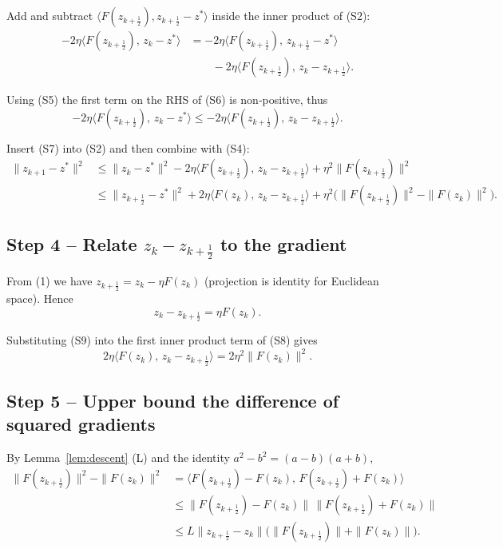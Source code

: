 \documentclass{article}
\begin{document}
Add and subtract $\langle F(z_{k+\frac12}),z_{k+\frac12}-z^{*}\rangle$ inside the inner product of (S2):
\[
\begin{aligned}
-2\eta\langle F(z_{k+\frac12}),\,z_{k}-z^{*}\rangle
&=-2\eta\langle F(z_{k+\frac12}),\,z_{k+\frac12}-z^{*}\rangle\\
&\qquad-2\eta\langle F(z_{k+\frac12}),\,z_{k}-z_{k+\frac12}\rangle .
\end{aligned}
\tag{S6}
\]

Using (S5) the first term on the RHS of (S6) is non‑positive, thus
\[
-2\eta\langle F(z_{k+\frac12}),\,z_{k}-z^{*}\rangle
\le -2\eta\langle F(z_{k+\frac12}),\,z_{k}-z_{k+\frac12}\rangle .
\tag{S7}
\]

Insert (S7) into (S2) and then combine with (S4):
\[
\begin{aligned}
\|z_{k+1}-z^{*}\|^{2}
&\le \|z_{k}-z^{*}\|^{2}
-2\eta\langle F(z_{k+\frac12}),\,z_{k}-z_{k+\frac12}\rangle
+\eta^{2}\|F(z_{k+\frac12})\|^{2} \\
&\le \|z_{k+\frac12}-z^{*}\|^{2}
+2\eta\langle F(z_{k}),\,z_{k}-z_{k+\frac12}\rangle
+\eta^{2}\bigl(\|F(z_{k+\frac12})\|^{2}-\|F(z_{k})\|^{2}\bigr).
\end{aligned}
\tag{S8}
\]

\subsection*{Step 4 – Relate $z_{k}-z_{k+\frac12}$ to the gradient}
From (1) we have $z_{k+\frac12}=z_{k}-\eta F(z_{k})$ (projection is identity for Euclidean space). Hence
\[
z_{k}-z_{k+\frac12}= \eta F(z_{k}).
\tag{S9}
\]

Substituting (S9) into the first inner product term of (S8) gives
\[
2\eta\langle F(z_{k}),\,z_{k}-z_{k+\frac12}\rangle
=2\eta^{2}\|F(z_{k})\|^{2}.
\tag{S10}
\]

\subsection*{Step 5 – Upper bound the difference of squared gradients}
By Lemma~\ref{lem:descent} (L) and the identity $a^{2}-b^{2}=(a-b)(a+b)$,
\[
\begin{aligned}
\|F(z_{k+\frac12})\|^{2}-\|F(z_{k})\|^{2}
&=\langle F(z_{k+\frac12})-F(z_{k}),\,F(z_{k+\frac12})+F(z_{k})\rangle\\
&\le \|F(z_{k+\frac12})-F(z_{k})\|\,\|F(z_{k+\frac12})+F(z_{k})\|\\
&\le L\|z_{k+\frac12}-z_{k}\|\bigl(\|F(z_{k+\frac12})\|+\|F(z_{k})\|\bigr) .
\end{aligned}
\tag{S11}
\]
\end{document}
